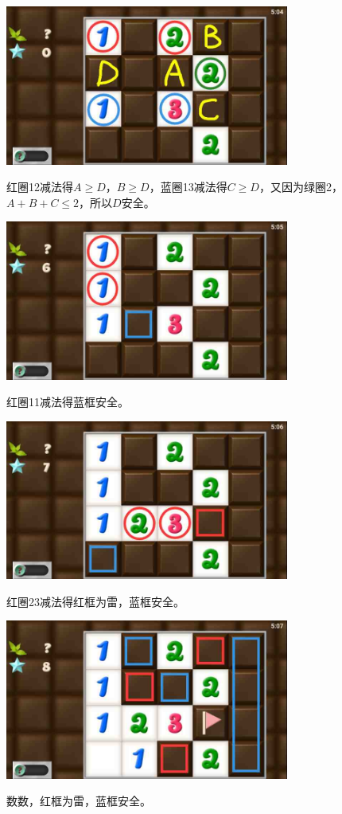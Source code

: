 \subsection{} %
\begin{center}
    \includegraphics[width=0.7\textwidth]{puzzlelow/77-1.jpg}
\end{center}
红圈12减法得$A\ge D$，$B\ge D$，蓝圈13减法得$C\ge D$，又因为绿圈2，$A+B+C\le 2$，所以$D$安全。
\begin{center}
    \includegraphics[width=0.7\textwidth]{puzzlelow/77-2.jpg}
\end{center}
红圈11减法得蓝框安全。
\begin{center}
    \includegraphics[width=0.7\textwidth]{puzzlelow/77-3.jpg}
\end{center}
红圈23减法得红框为雷，蓝框安全。
\begin{center}
    \includegraphics[width=0.7\textwidth]{puzzlelow/77-4.jpg}
\end{center}
数数，红框为雷，蓝框安全。

